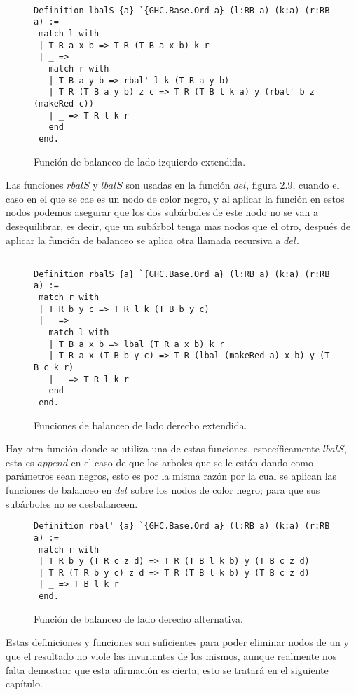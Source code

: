 \begin{figure}
\centering
\captionsetup{justification=centering}
\begin{verbatim}

Definition lbalS {a} `{GHC.Base.Ord a} (l:RB a) (k:a) (r:RB a) :=
 match l with
 | T R a x b => T R (T B a x b) k r
 | _ =>
   match r with
   | T B a y b => rbal' l k (T R a y b)
   | T R (T B a y b) z c => T R (T B l k a) y (rbal' b z (makeRed c))
   | _ => T R l k r
   end
 end.

\end{verbatim}
\caption{Funci\'on de balanceo de lado izquierdo extendida.}
\end{figure}

Las funciones $rbalS$ y $lbalS$ son usadas en la funci\'on $del$, figura 2.9, cuando el caso en el
que se cae es un nodo de color negro, y al aplicar la funci\'on en estos nodos podemos asegurar
que los dos subárboles de este nodo no se van a desequilibrar, es decir, que un subárbol tenga mas
nodos que el otro, después de aplicar la función de balanceo se aplica otra llamada recursiva a
$del$.


\begin{figure}
\centering
\captionsetup{justification=centering}
\begin{verbatim}

Definition rbalS {a} `{GHC.Base.Ord a} (l:RB a) (k:a) (r:RB a) :=
 match r with
 | T R b y c => T R l k (T B b y c)
 | _ =>
   match l with
   | T B a x b => lbal (T R a x b) k r
   | T R a x (T B b y c) => T R (lbal (makeRed a) x b) y (T B c k r)
   | _ => T R l k r
   end
 end.

\end{verbatim}
\caption{Funciones de balanceo de lado derecho extendida.}
\end{figure}

Hay otra función donde se utiliza una de estas funciones, específicamente $lbalS$, esta es $append$
en el caso de que los arboles que se le están dando como parámetros sean negros, esto es por la
misma razón por la cual se aplican las funciones de balanceo en $del$ sobre los nodos de color
negro; para que sus subárboles no se desbalanceen.

\begin{figure}
\centering
\captionsetup{justification=centering}
\begin{verbatim}
Definition rbal' {a} `{GHC.Base.Ord a} (l:RB a) (k:a) (r:RB a) :=
 match r with
 | T R b y (T R c z d) => T R (T B l k b) y (T B c z d)
 | T R (T R b y c) z d => T R (T B l k b) y (T B c z d)
 | _ => T B l k r
 end.

\end{verbatim}
\caption{Funci\'on de balanceo de lado derecho alternativa.}
\end{figure}

Estas definiciones y funciones son suficientes para poder eliminar nodos de un {\arn} y que el
resultado no viole las invariantes de los mismos, aunque realmente nos falta demostrar que esta
afirmaci\'on es cierta, esto se tratar\'a en el siguiente cap\'itulo.   
